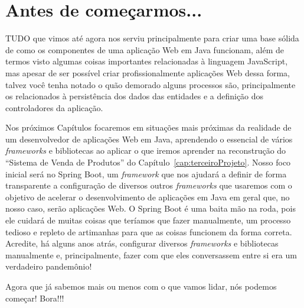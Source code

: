 \chapter*{Antes de começarmos...}

\lettrine[lines=4, lhang=0.1, lraise=0, loversize=0.2, findent=0.1em]{\textcolor{corTema}{T}}{UDO} que vimos até agora nos serviu principalmente para criar uma base sólida de como os componentes de uma aplicação Web em Java funcionam, além de termos visto algumas coisas importantes relacionadas à linguagem JavaScript, mas apesar de ser possível criar profissionalmente aplicações Web dessa forma, talvez você tenha notado o quão demorado alguns processos são, principalmente os relacionados à persistência dos dados das entidades e a definição dos controladores da aplicação.

Nos próximos Capítulos focaremos em situações mais próximas da realidade de um desenvolvedor de aplicações Web em Java, aprendendo o essencial de vários \textit{frameworks} e bibliotecas ao aplicar o que iremos aprender na reconstrução do ``Sistema de Venda de Produtos'' do Capítulo~\ref{cap:terceiroProjeto}. Nosso foco inicial será no Spring Boot, um \textit{framework} que nos ajudará a definir de forma transparente a configuração de diversos outros \textit{frameworks} que usaremos com o objetivo de acelerar o desenvolvimento de aplicações em Java em geral que, no nosso caso, serão aplicações Web. O Spring Boot é uma baita mão na roda, pois ele cuidará de muitas coisas que teríamos que fazer manualmente, um processo tedioso e repleto de artimanhas para que as coisas funcionem da forma correta. Acredite, há alguns anos atrás, configurar diversos \textit{frameworks} e bibliotecas manualmente e, principalmente, fazer com que eles conversassem entre si era um verdadeiro pandemônio!

Agora que já sabemos mais ou menos com o que vamos lidar, nós podemos começar! Bora!!!
